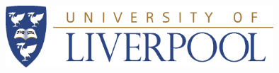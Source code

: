 \documentclass[
11pt, %
english, %
singlespacing, %
headsepline, %
]{MastersDoctoralThesis} %
\author{Felix \textsc{Soubelet}} %
\begin{document}
\frontmatter %

\pagestyle{plain} %



\begin{titlepage}
\begin{center}

\vspace*{.06\textheight}
\vspace{1cm}
{\scshape\LARGE \univname\par} %
\vspace{0.8cm}

\begin{figure}[htp]
  \hspace{1.5cm}
  \hspace{1.5cm}
  \hspace{1.5cm}
\end{figure}

\HRule \\[0.4cm] %
{\huge \bfseries \ttitle\par}\vspace{0.4cm} %
\HRule \\[1cm] %
 
\begin{figure}[ht]
	\begin{center}
		\includegraphics[width=10cm]{Figures/UoLlogo.eps}
	\end{center}
\end{figure}


\end{center}
\end{titlepage}
\end{document}
